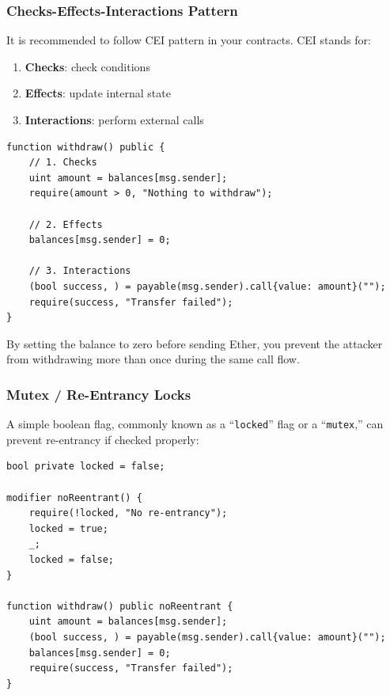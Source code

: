 \documentclass[12pt]{article}
\newcommand{\codeinline}[1]{\texttt{#1}}
\begin{document}
\subsubsection*{Checks-Effects-Interactions Pattern}

It is recommended to follow CEI pattern in your contracts. CEI stands for:

\begin{enumerate}
    \item \textbf{Checks}: check conditions
    \item \textbf{Effects}: update internal state
    \item \textbf{Interactions}: perform external calls
\end{enumerate}

\noindent
\begin{minipage}{\textwidth}
    \begin{lstlisting}[language=Solidity]
function withdraw() public {
    // 1. Checks
    uint amount = balances[msg.sender];
    require(amount > 0, "Nothing to withdraw");

    // 2. Effects
    balances[msg.sender] = 0;

    // 3. Interactions
    (bool success, ) = payable(msg.sender).call{value: amount}("");
    require(success, "Transfer failed");
}
\end{lstlisting}
\end{minipage}

\noindent
By setting the balance to zero before sending Ether, you prevent the attacker from withdrawing more than once during the same call flow.

\subsubsection*{Mutex / Re-Entrancy Locks}

A simple boolean flag, commonly known as a “\codeinline{locked}” flag or a
“\codeinline{mutex},” can prevent re-entrancy if checked properly:

\noindent
\begin{minipage}{\textwidth}
    \begin{lstlisting}[language=Solidity]
bool private locked = false;

modifier noReentrant() {
    require(!locked, "No re-entrancy");
    locked = true;
    _;
    locked = false;
}

function withdraw() public noReentrant {
    uint amount = balances[msg.sender];
    (bool success, ) = payable(msg.sender).call{value: amount}("");
    balances[msg.sender] = 0;
    require(success, "Transfer failed");
}
\end{lstlisting}
\end{minipage}
\end{document}
